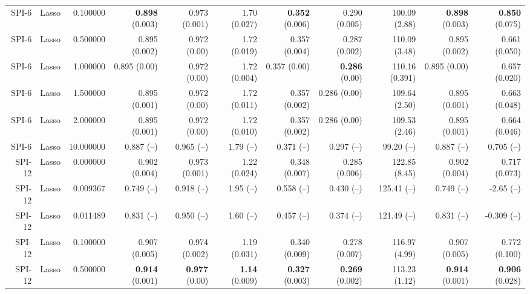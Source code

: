 \begin{table}
\begin{tabular}{rrrrrrrrrrr}
  SPI-6 &     Lasso &  0.100000 & { \bf 0.898} (0.003) &       0.973 (0.001) &        1.70 (0.027) & { \bf 0.352} (0.006) &        0.290 (0.005) &         100.09 (2.88) & { \bf 0.898} (0.003) & { \bf 0.850} (0.075) \\
  SPI-6 &     Lasso &  0.500000 &        0.895 (0.002) &        0.972 (0.00) &        1.72 (0.019) &        0.357 (0.004) &        0.287 (0.002) &         110.09 (3.48) &        0.895 (0.002) &        0.661 (0.050) \\
  SPI-6 &     Lasso &  1.000000 &         0.895 (0.00) &        0.972 (0.00) &        1.72 (0.004) &         0.357 (0.00) &  { \bf 0.286} (0.00) &        110.16 (0.391) &         0.895 (0.00) &        0.657 (0.020) \\
  SPI-6 &     Lasso &  1.500000 &        0.895 (0.001) &        0.972 (0.00) &        1.72 (0.011) &        0.357 (0.002) &         0.286 (0.00) &         109.64 (2.50) &        0.895 (0.001) &        0.663 (0.048) \\
  SPI-6 &     Lasso &  2.000000 &        0.895 (0.001) &        0.972 (0.00) &        1.72 (0.010) &        0.357 (0.002) &         0.286 (0.00) &         109.53 (2.46) &        0.895 (0.001) &        0.664 (0.046) \\
  SPI-6 &     Lasso & 10.000000 &           0.887 (--) &          0.965 (--) &           1.79 (--) &           0.371 (--) &           0.297 (--) &            99.20 (--) &           0.887 (--) &           0.705 (--) \\
 SPI-12 &     Lasso &  0.000000 &        0.902 (0.004) &       0.973 (0.001) &        1.22 (0.024) &        0.348 (0.007) &        0.285 (0.006) &         122.85 (8.45) &        0.902 (0.004) &        0.717 (0.073) \\
 SPI-12 &     Lasso &  0.009367 &           0.749 (--) &          0.918 (--) &           1.95 (--) &           0.558 (--) &           0.430 (--) &           125.41 (--) &           0.749 (--) &           -2.65 (--) \\
 SPI-12 &     Lasso &  0.011489 &           0.831 (--) &          0.950 (--) &           1.60 (--) &           0.457 (--) &           0.374 (--) &           121.49 (--) &           0.831 (--) &          -0.309 (--) \\
 SPI-12 &     Lasso &  0.100000 &        0.907 (0.005) &       0.974 (0.002) &        1.19 (0.031) &        0.340 (0.009) &        0.278 (0.007) &         116.97 (4.99) &        0.907 (0.005) &        0.772 (0.100) \\
 SPI-12 &     Lasso &  0.500000 & { \bf 0.914} (0.001) & { \bf 0.977} (0.00) & { \bf 1.14} (0.009) & { \bf 0.327} (0.003) & { \bf 0.269} (0.002) &         113.23 (1.12) & { \bf 0.914} (0.001) & { \bf 0.906} (0.028) \\

\end{tabular}
\end{table}
